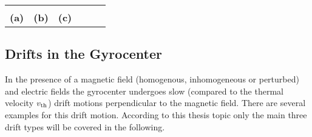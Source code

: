 \begin{center}
    \captionsetup{type=figure}
    \begin{tabular}{c c c c c c}
         &
         &
        \\[0.3cm]
        \textbf{(a)} & \textbf{(b)} & \textbf{(c)} \\
    \end{tabular}
    \label{fig:perp-par-motion}
\end{center}

\newpage

\subsection{Drifts in the Gyrocenter}
\label{sub:drift}

In the presence of a magnetic field (homogenous, inhomogeneous or perturbed) and electric fields the gyrocenter undergoes slow (compared to the thermal velocity $v_{\mathrm{th}}$) drift motions perpendicular to the magnetic field. There are several examples for this drift motion. According to this thesis topic only the main three drift types will be covered in the following.

